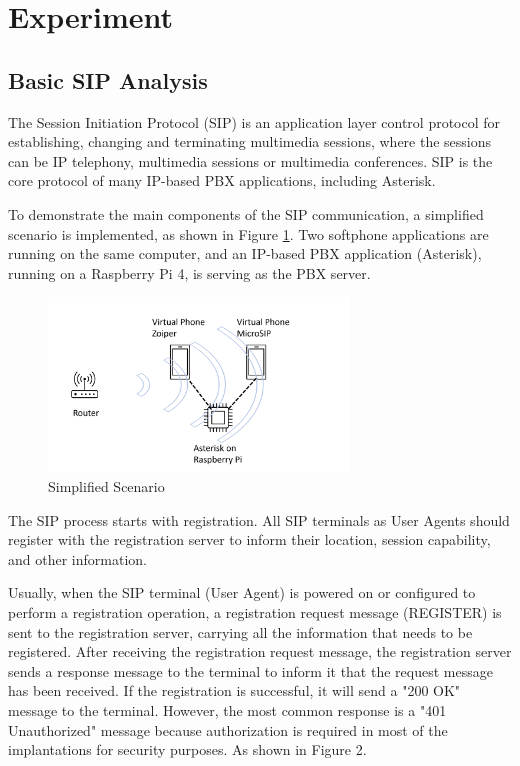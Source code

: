 \section{Experiment}	
\label{sec:sip}


\subsection{Basic SIP Analysis}

The Session Initiation Protocol (SIP) is an application layer control protocol for establishing, changing and terminating multimedia sessions, where the sessions can be IP telephony, multimedia sessions or multimedia conferences. SIP is the core protocol of many IP-based PBX applications, including Asterisk.

To demonstrate the main components of the SIP communication, a simplified scenario is implemented, as shown in Figure \ref{fig:topo}. Two softphone applications are running on the same computer, and an IP-based PBX application (Asterisk), running on a Raspberry Pi 4, is serving as the PBX server.

\begin{figure}[htbp]
\centerline{\includegraphics[width=8cm]{Images/experiment/exp1.png}}
\caption{Simplified Scenario}
\label{fig:topo}
\end{figure}

The SIP process starts with registration. All SIP terminals as User Agents should register with the registration server to inform their location, session capability, and other information.

Usually, when the SIP terminal (User Agent) is powered on or configured to perform a registration operation, a registration request message (REGISTER) is sent to the registration server, carrying all the information that needs to be registered. After receiving the registration request message, the registration server sends a response message to the terminal to inform it that the request message has been received. If the registration is successful, it will send a "200 OK" message to the terminal. However, the most common response is a "401 Unauthorized" message because authorization is required in most of the implantations for security purposes. As shown in Figure 2.


